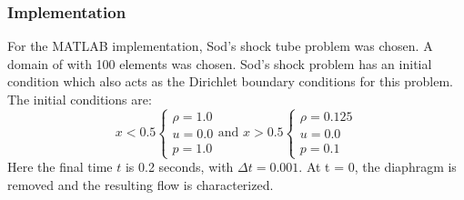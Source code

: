 \documentclass[12pt, oneside]{article}
\begin{document}
\subsubsection{Implementation}
For the MATLAB implementation, Sod's shock tube problem was chosen. A domain of with 100 elements was chosen. Sod's shock problem has an initial condition which also acts as the Dirichlet boundary conditions for this problem. The initial conditions are:
\begin{equation}
    x < 0.5 \begin{cases}
    	\rho = 1.0 \\
	u = 0.0 \\
	p = 1.0
	\end{cases} \text{and } x > 0.5 \begin{cases}
    	\rho = 0.125 \\
	u = 0.0\\
	p = 0.1
    \end{cases} 
    \label{init-condn-1d}
\end{equation}
Here the final time $t$ is 0.2 seconds, with $\Delta t = 0.001$. At t = 0, the diaphragm is removed and the resulting flow is characterized. 
\end{document}
